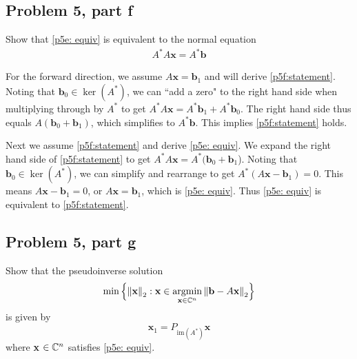 \newpage
\subsection{Problem 5, part f}
Show that \ref{p5e: equiv} is equivalent to the normal equation
\begin{align}
A^*A\textbf{x} = A^*\textbf{b} \label{p5f:statement} 
\end{align}


\partbreak
\begin{solution}

For the forward direction, we assume $A\textbf{x} = \textbf{b}_1$ and will derive \ref{p5f:statement}. Noting that $\textbf{b}_0 \in \ker(A^*)$, we can ``add a zero"  to the right hand side when multiplying through by $A^*$ to get  $A^*A\textbf{x} = A^*\textbf{b}_1 + A^*\textbf{b}_0$. The right hand side thus equals $A(\textbf{b}_0 + \textbf{b}_1)$, which simplifies to $A^*\textbf{b}$. This implies \ref{p5f:statement} holds. 

\jump
Next we assume \ref{p5f:statement} and derive \ref{p5e: equiv}.  We expand the right hand side of \ref{p5f:statement} to get $A^*A\textbf{x} = A^*(\textbf{b}_0 + \textbf{b}_1$). Noting that $\textbf{b}_0 \in \ker(A^*)$, we can simplify and rearrange to get $A^*(A\textbf{x} - \textbf{b}_1) = 0$. This means $A\textbf{x} - \textbf{b}_1 = 0$, or $A\textbf{x} = \textbf{b}_1$, which is \ref{p5e: equiv}. Thus \ref{p5e: equiv} is equivalent to \ref{p5f:statement}.
\end{solution}

\newpage
\subsection{Problem 5, part g}
Show that the pseudoinverse solution
\[
\min \Big\{ \norm{\textbf{x}}_2 : \textbf{x} \in \operatorname*{argmin}_{\textbf{x} \in \mathbb{C}^n}\norm{\textbf{b} - A\textbf{x}}_2\Big\}
\]
is given by
\[
\textbf{x}_1 = P_{\text{im}(A^*)}\textbf{x}
\]
where \textbf{x} $\in \mathbb{C}^n$ satisfies \ref{p5e: equiv}.

